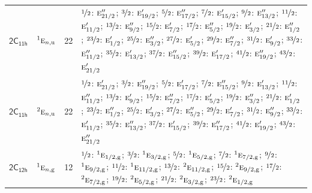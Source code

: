 \documentclass[10pt,a4paper]{article}
\numberwithin{equation}{section}
\newcommand{\grp}[1]{\mathsf{#1}}
\newcommand{\irr}[1]{\text{\normalfont\scshape #1}}
\newcommand{\conjpair}[1]{{}^{#1}}
\newcommand{\ptag}[1]{\mathrm{#1}}
\newlength{\fillwidth}\newlength{\cellwidth}\newlength{\colwidth}
\begin{document}
{\begin{longtable}{@{}llr>{\RaggedRight\arraybackslash}p{\fillwidth}@{}}
\href{2C11h.pdf}{$\grp{2C_{11h}}$} & $\conjpair{1}\irr{e}_{n,\ptag{u}}$ & 22 & $\nicefrac{1}{2}$: $\irr{e}_{21/2}''$; $\nicefrac{3}{2}$: $\irr{e}_{19/2}'$; $\nicefrac{5}{2}$: $\irr{e}_{17/2}''$; $\nicefrac{7}{2}$: $\irr{e}_{15/2}'$; $\nicefrac{9}{2}$: $\irr{e}_{13/2}''$; $\nicefrac{11}{2}$: $\irr{e}_{11/2}'$; $\nicefrac{13}{2}$: $\irr{e}_{9/2}''$; $\nicefrac{15}{2}$: $\irr{e}_{7/2}'$; $\nicefrac{17}{2}$: $\irr{e}_{5/2}''$; $\nicefrac{19}{2}$: $\irr{e}_{3/2}'$; $\nicefrac{21}{2}$: $\irr{e}_{1/2}''$; $\nicefrac{23}{2}$: $\irr{e}_{1/2}'$; $\nicefrac{25}{2}$: $\irr{e}_{3/2}''$; $\nicefrac{27}{2}$: $\irr{e}_{5/2}'$; $\nicefrac{29}{2}$: $\irr{e}_{7/2}''$; $\nicefrac{31}{2}$: $\irr{e}_{9/2}'$; $\nicefrac{33}{2}$: $\irr{e}_{11/2}''$; $\nicefrac{35}{2}$: $\irr{e}_{13/2}'$; $\nicefrac{37}{2}$: $\irr{e}_{15/2}''$; $\nicefrac{39}{2}$: $\irr{e}_{17/2}'$; $\nicefrac{41}{2}$: $\irr{e}_{19/2}''$; $\nicefrac{43}{2}$: $\irr{e}_{21/2}'$\\
\href{2C11h.pdf}{$\grp{2C_{11h}}$} & $\conjpair{2}\irr{e}_{n,\ptag{u}}$ & 22 & $\nicefrac{1}{2}$: $\irr{e}_{21/2}'$; $\nicefrac{3}{2}$: $\irr{e}_{19/2}''$; $\nicefrac{5}{2}$: $\irr{e}_{17/2}'$; $\nicefrac{7}{2}$: $\irr{e}_{15/2}''$; $\nicefrac{9}{2}$: $\irr{e}_{13/2}'$; $\nicefrac{11}{2}$: $\irr{e}_{11/2}''$; $\nicefrac{13}{2}$: $\irr{e}_{9/2}'$; $\nicefrac{15}{2}$: $\irr{e}_{7/2}''$; $\nicefrac{17}{2}$: $\irr{e}_{5/2}'$; $\nicefrac{19}{2}$: $\irr{e}_{3/2}''$; $\nicefrac{21}{2}$: $\irr{e}_{1/2}'$; $\nicefrac{23}{2}$: $\irr{e}_{1/2}''$; $\nicefrac{25}{2}$: $\irr{e}_{3/2}'$; $\nicefrac{27}{2}$: $\irr{e}_{5/2}''$; $\nicefrac{29}{2}$: $\irr{e}_{7/2}'$; $\nicefrac{31}{2}$: $\irr{e}_{9/2}''$; $\nicefrac{33}{2}$: $\irr{e}_{11/2}'$; $\nicefrac{35}{2}$: $\irr{e}_{13/2}''$; $\nicefrac{37}{2}$: $\irr{e}_{15/2}'$; $\nicefrac{39}{2}$: $\irr{e}_{17/2}''$; $\nicefrac{41}{2}$: $\irr{e}_{19/2}'$; $\nicefrac{43}{2}$: $\irr{e}_{21/2}''$\\
\href{2C12h.pdf}{$\grp{2C_{12h}}$} & $\conjpair{1}\irr{e}_{n,\ptag{g}}$ & 12 & $\nicefrac{1}{2}$: $\conjpair{1}\irr{e}_{1/2,\ptag{g}}$; $\nicefrac{3}{2}$: $\conjpair{1}\irr{e}_{3/2,\ptag{g}}$; $\nicefrac{5}{2}$: $\conjpair{1}\irr{e}_{5/2,\ptag{g}}$; $\nicefrac{7}{2}$: $\conjpair{1}\irr{e}_{7/2,\ptag{g}}$; $\nicefrac{9}{2}$: $\conjpair{1}\irr{e}_{9/2,\ptag{g}}$; $\nicefrac{11}{2}$: $\conjpair{1}\irr{e}_{11/2,\ptag{g}}$; $\nicefrac{13}{2}$: $\conjpair{2}\irr{e}_{11/2,\ptag{g}}$; $\nicefrac{15}{2}$: $\conjpair{2}\irr{e}_{9/2,\ptag{g}}$; $\nicefrac{17}{2}$: $\conjpair{2}\irr{e}_{7/2,\ptag{g}}$; $\nicefrac{19}{2}$: $\conjpair{2}\irr{e}_{5/2,\ptag{g}}$; $\nicefrac{21}{2}$: $\conjpair{2}\irr{e}_{3/2,\ptag{g}}$; $\nicefrac{23}{2}$: $\conjpair{2}\irr{e}_{1/2,\ptag{g}}$\\

\end{longtable}}
\end{document}
